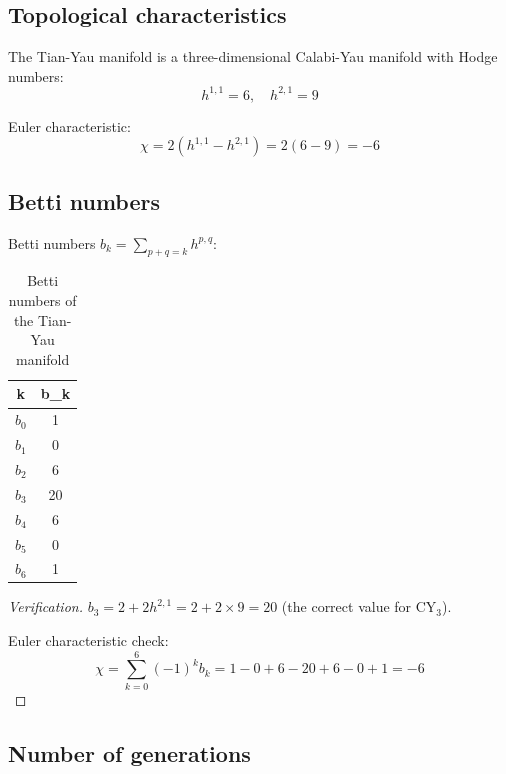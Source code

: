 \documentclass[12pt,a4paper,twoside]{article}
\theoremstyle{definition}
\begin{document}
\subsection{Topological characteristics}

The Tian-Yau manifold \cite{Tian:1986} is a three-dimensional Calabi-Yau manifold with Hodge numbers:
\begin{equation}
h^{1,1} = 6, \quad h^{2,1} = 9
\label{eq:hodge}
\end{equation}

Euler characteristic:
\begin{equation}
\chi = 2(h^{1,1} - h^{2,1}) = 2(6 - 9) = -6
\label{eq:euler}
\end{equation}

\subsection{Betti numbers}

Betti numbers $b_k = \sum_{p+q=k} h^{p,q}$:

\begin{table}[H]
\centering
\small
\caption{Betti numbers of the Tian-Yau manifold}
\label{tab:betti}
\begin{tabular}{c|c}
\toprule
\textbf{k} & \textbf{b\_k} \\
\midrule
$b_0$ & 1 \\
$b_1$ & 0 \\
$b_2$ & 6 \\
$b_3$ & 20 \\
$b_4$ & 6 \\
$b_5$ & 0 \\
$b_6$ & 1 \\
\bottomrule
\end{tabular}
\end{table}

\begin{proof}[Verification]
$b_3 = 2 + 2h^{2,1} = 2 + 2 \times 9 = 20$ (the correct value for CY$_3$).

Euler characteristic check:
\begin{equation}
\chi = \sum_{k=0}^{6} (-1)^k b_k = 1 - 0 + 6 - 20 + 6 - 0 + 1 = -6
\end{equation}
\end{proof}

\subsection{Number of generations}
\end{document}

